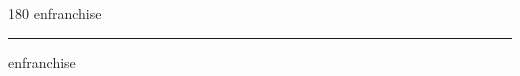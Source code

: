 
\begin{frame}
\begin{center}
\begin{turn}{180}
{\fontsize{2.5cm}{1em}\selectfont enfranchise}
\end{turn}
\vspace{1em}\par  
\hrule
\vspace{1em}\par  
{\fontsize{2.5cm}{1em}\selectfont enfranchise}
\end{center}
\end{frame}
